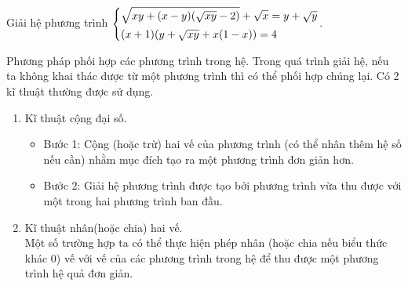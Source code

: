 \begin{ex}%
Giải hệ phương trình $\left\{\begin{aligned}&\sqrt{xy+(x-y)(\sqrt{xy}-2)}+\sqrt{x}=y+\sqrt{y}\\&(x+1)(y+\sqrt{xy}+x(1-x))=4\end{aligned}\right.$.
\end{ex}


\begin{dang}{Phương pháp phối hợp các phương trình trong hệ.}
Trong quá trình giải hệ, nếu ta không khai thác được từ một phương trình thì có thể phối hợp chúng lại. Có 2 kĩ thuật thường được sử dụng.
    \begin{enumerate}[1.]
    	\item Kĩ thuật cộng đại số.
    	\begin{itemize}
    		\item Bước 1: Cộng (hoặc trừ) hai vế của phương trình (có thể nhân thêm hệ số nếu cần) nhằm mục đích tạo ra một phương trình đơn giản hơn.
    		\item Bước 2: Giải hệ phương trình được tạo bởi phương trình vừa thu được với một trong hai phương trình  ban đầu.
    	\end{itemize}
    	\item Kĩ thuật nhân(hoặc chia) hai vế.\\
    	Một số trường hợp ta có thể thực hiện phép nhân (hoặc chia nếu biểu thức khác 0) vế với vế của các phương trình trong hệ để thu được một phương trình hệ quả đơn giản.
    \end{enumerate} 
\end{dang}

